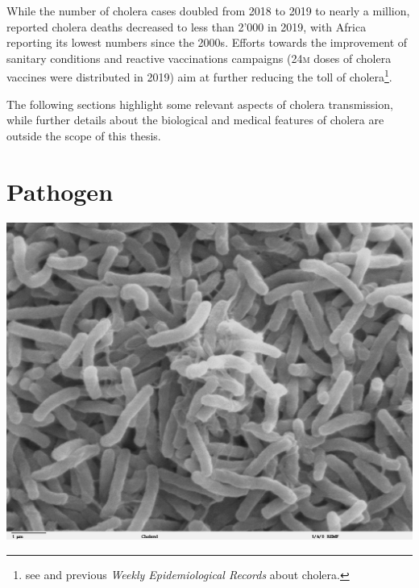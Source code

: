 While the number of cholera cases doubled from 2018 to 2019 to nearly a million, reported cholera deaths decreased to less than 2'000 in 2019, with Africa reporting its lowest numbers since the 2000s. Efforts towards the improvement of sanitary conditions and reactive vaccinations campaigns (24\textsc{m} doses of cholera vaccines were distributed in 2019) aim at further reducing the toll of cholera\footnote{see  and previous \textit{Weekly Epidemiological Records} about cholera.}. 

The following sections highlight some relevant aspects of cholera transmission, while further details about the biological and medical features of cholera are outside the scope of this thesis.

\section{Pathogen} 
\begin{marginfigure}[6\baselineskip]
\centering
\includegraphics{fig/vibrio}
\label{fig:bacteria}
\end{marginfigure}
